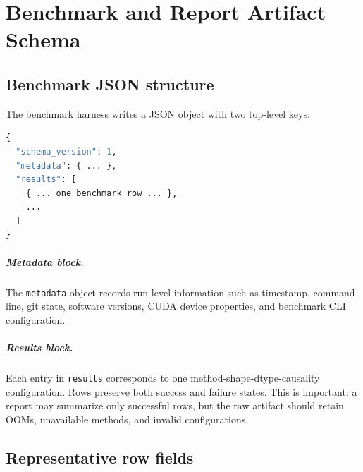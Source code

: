 \chapter{Benchmark and Report Artifact Schema}
\label{app:result-schema}

\section{Benchmark JSON structure}

The benchmark harness writes a JSON object with two top-level keys:
\begin{lstlisting}[language=Python,caption={Conceptual benchmark JSON schema.}]
{
  "schema_version": 1,
  "metadata": { ... },
  "results": [
    { ... one benchmark row ... },
    ...
  ]
}
\end{lstlisting}

\paragraph{Metadata block.}
The \texttt{metadata} object records run-level information such as timestamp, command line, git state, software versions, CUDA device properties, and benchmark CLI configuration.

\paragraph{Results block.}
Each entry in \texttt{results} corresponds to one method-shape-dtype-causality configuration. Rows preserve both success and failure states. This is important: a report may summarize only successful rows, but the raw artifact should retain OOMs, unavailable methods, and invalid configurations.

\section{Representative row fields}

